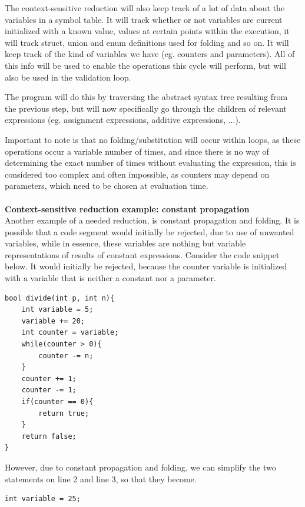\documentclass[12pt]{article}
\begin{document}
The context-sensitive reduction will also keep track of a lot of data about the variables in a symbol table. It will track whether or not variables are current initialized with a known value, values at certain points within the execution, it will track struct, union and enum definitions used for folding and so on. It will keep track of the kind of variables we have (eg. counters and parameters). All of this info will be used to enable the operations this cycle will perform, but will also be used in the validation loop.

The program will do this by traversing the abstract syntax tree resulting from the previous step, but will now specifically go through the children of relevant expressions (eg. assignment expressions, additive expressions, ...).

Important to note is that no folding/substitution will occur within loops, as these operations occur a variable number of times, and since there is no way of determining the exact number of times without evaluating the expression, this is considered too complex and often impossible, as counters may depend on parameters, which need to be chosen at evaluation time.\\
\\
\noindent
\textbf{Context-sensitive reduction example: constant propagation}\\
Another example of a needed reduction, is constant propagation and folding. It is possible that a code segment would initially be rejected, due to use of unwanted variables, while in essence, these variables are nothing but variable representations of results of constant expressions. Consider the code snippet below. It would initially be rejected, because the counter variable is initialized with a variable that is neither a constant nor a parameter.

\begin{lstlisting}[style=CStyle]
bool divide(int p, int n){
	int variable = 5;
	variable += 20;
	int counter = variable;
	while(counter > 0){
		counter -= n;
	}
	counter += 1;
	counter -= 1;
	if(counter == 0){
		return true;
	}
	return false;
}
\end{lstlisting}

However, due to constant propagation and folding, we can simplify the two statements on line 2 and line 3, so that they become.

\begin{lstlisting}[style=CStyle]
int variable = 25;
\end{lstlisting}
\end{document}
